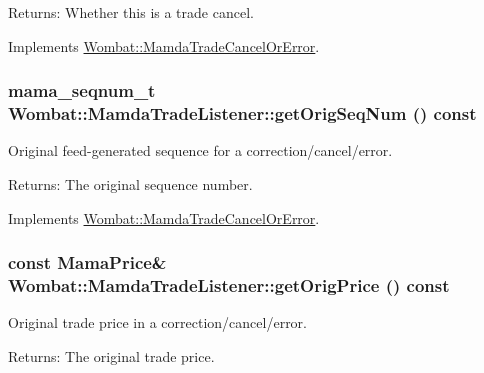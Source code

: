 \begin{Desc}
\item[Returns:]Whether this is a trade cancel. \end{Desc}


Implements \hyperlink{classWombat_1_1MamdaTradeCancelOrError_2dc051dab18a59a13febfe4edcaa34ae}{Wombat::Mamda\-Trade\-Cancel\-Or\-Error}.\hypertarget{classWombat_1_1MamdaTradeListener_571a08fa4c669481abf0417a36064205}{
\subsubsection[getOrigSeqNum]{\setlength{\rightskip}{0pt plus 5cm}mama\_\-seqnum\_\-t Wombat::Mamda\-Trade\-Listener::get\-Orig\-Seq\-Num () const}}
\label{classWombat_1_1MamdaTradeListener_571a08fa4c669481abf0417a36064205}


Original feed-generated sequence for a correction/cancel/error. 

\begin{Desc}
\item[Returns:]The original sequence number. \end{Desc}


Implements \hyperlink{classWombat_1_1MamdaTradeCancelOrError_b60912ebb0e47bea0b5a0f0560f9fcfa}{Wombat::Mamda\-Trade\-Cancel\-Or\-Error}.\hypertarget{classWombat_1_1MamdaTradeListener_7550297d285f7e2ab6b6e7060ed28f74}{
\subsubsection[getOrigPrice]{\setlength{\rightskip}{0pt plus 5cm}const Mama\-Price\& Wombat::Mamda\-Trade\-Listener::get\-Orig\-Price () const}}
\label{classWombat_1_1MamdaTradeListener_7550297d285f7e2ab6b6e7060ed28f74}


Original trade price in a correction/cancel/error. 

\begin{Desc}
\item[Returns:]The original trade price. \end{Desc}


